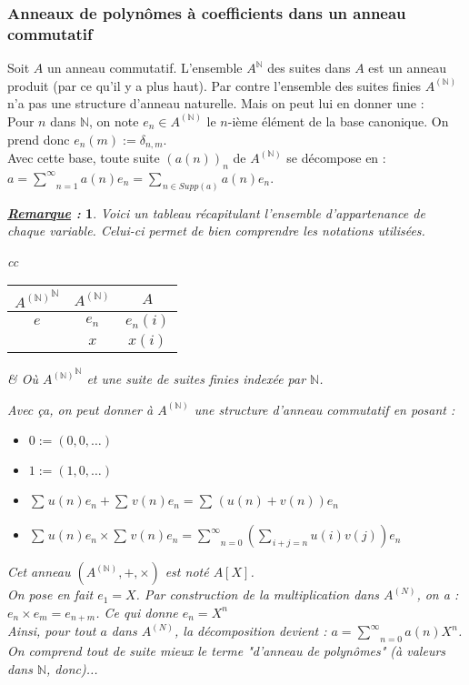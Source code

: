 \documentclass{article}           %
\newcommand\N{\mathbb{N}}
\newcommand\summ[2]{\underset{#1}{\overset{#2}{\sum}}} 		%
\theoremstyle{break}
\theoremstyle{add}
\theoremstyle{break} %
\theoremstyle{add}
\newtheorem*{remarque}{\textit{\underline{Remarque} : }}
\begin{document}
\subsubsection{Anneaux de polynômes à coefficients dans un anneau commutatif}
Soit $A$ un anneau commutatif. L'ensemble $A^{\N}$ des suites dans $A$ est un anneau produit (par ce qu'il y a plus haut).
Par contre l'ensemble des suites finies  $A^{(\N)}$ n'a pas une structure d'anneau naturelle. Mais on peut lui en donner une : \\

Pour $n$ dans $\N$, on note $e_n \in A^{(\N)}$ le $n$-ième élément de la base canonique. On prend donc $e_n(m) := \delta_{n,m}$. \\
Avec cette base, toute suite $(a(n))_n$ de $A^{(\N)}$ se décompose en : $a = \summ{n=1}{\infty}a(n)e_n = \summ{n \in Supp(a)}{} a(n)e_n $. \\

\begin{remarque}
Voici un tableau récapitulant l'ensemble d'appartenance de chaque variable. Celui-ci permet de bien comprendre les notations utilisées. \\

\begin{tabular}{cc}
\begin{tabular}{|c|c|c|}
\hline
${A^{(\N)}}^{\N}$    &    $A^{(\N)}$   &   $A$ \\
\hline
$e$ & $e_n$ & $e_n(i)$ \\
\hline
      & $x$     & $x(i)$    \\
\hline
\end{tabular} &
Où ${A^{(\N)}}^{\N}$ et une suite de suites finies indexée par $\N$. \\
\end{tabular}

\vspace{0.3cm}

Avec ça, on peut donner à $A^{(\N)}$ une structure d'anneau commutatif en posant :
\begin{itemize}
\item $0 := (0,0, \ldots)$
\item $ 1 := (1, 0, \ldots)$
\item $\summ{}{}u(n)e_n + \summ{}{}v(n)e_n = \summ{}{}(u(n)+v(n))e_n$
\item $\summ{}{}u(n)e_n \times \summ{}{}v(n)e_n = \summ{n=0}{\infty} \left( \summ{i+j=n}{}u(i)v(j)  \right) e_n $
\end{itemize}

Cet anneau $(A^{(\N)}, +, \times)$ est noté $A[X]$. \\
On pose en fait $e_1 = X$. Par construction de la multiplication dans $A^{(N)}$, on a : $e_n \times e_m = e_{n+m}$. Ce qui donne $e_n = X^n$\\
Ainsi, pour tout $a$ dans $A^{(N)}$, la décomposition devient : $ a = \summ{n=0}{\infty} a(n)X^n$. \\
On comprend tout de suite mieux le terme "d'anneau de polynômes" (à valeurs dans $\N$, donc)...
\end{remarque}
\end{document}
